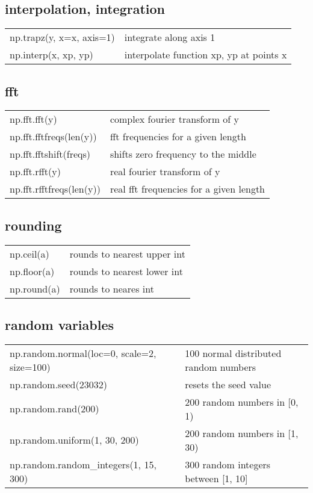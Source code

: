 \documentclass[10pt, a4paper, twocolumn]{article}
\begin{document}
\subsection*{interpolation, integration}
\begin{tabular}{ p{} p{} }
  np.trapz(y, x=x, axis=1) & integrate along axis 1\\
  np.interp(x, xp, yp) & interpolate function xp, yp at points x\\
\end{tabular}

\subsection*{fft}
\begin{tabular}{ p{} p{} }
  np.fft.fft(y) & complex fourier transform of y\\
  np.fft.fftfreqs(len(y)) & fft frequencies for a given length\\
  np.fft.fftshift(freqs)   & shifts zero frequency to the middle\\
  np.fft.rfft(y) & real fourier transform of y\\
  np.fft.rfftfreqs(len(y)) & real fft frequencies for a given length\\
\end{tabular}

\subsection*{rounding}
\begin{tabular}{ p{} p{} }
  np.ceil(a) & rounds to nearest upper int\\
  np.floor(a) & rounds to nearest lower int\\
  np.round(a) & rounds to neares int\\
\end{tabular}

\subsection*{random variables}
\begin{tabular}{ p{} p{} }
  np.random.normal(loc=0, scale=2, size=100) & 100 normal distributed random numbers\\
  np.random.seed(23032) & resets the seed value\\
  np.random.rand(200) & 200 random numbers in [0, 1)\\
  np.random.uniform(1, 30, 200)         & 200 random numbers in [1, 30)\\
  np.random.random\_integers(1, 15, 300) & 300 random integers between [1, 10]\\
\end{tabular}
\end{document}
